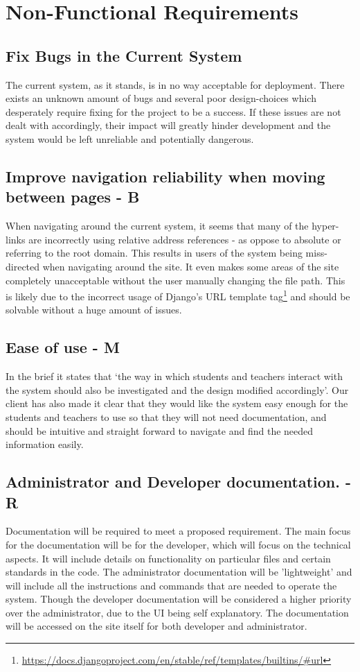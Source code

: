 \documentclass[12pt]{article}
\begin{document}
	\newpage
	
	\section{Non-Functional Requirements}
	\subsection{Fix Bugs in the Current System}
	The current system, as it stands, is in no way acceptable for deployment. There exists an unknown amount of bugs and several poor design-choices which desperately require fixing for the project to be a success. If these issues are not dealt with accordingly, their impact will greatly hinder development and the system would be left unreliable and potentially dangerous.
	\subsection{Improve navigation reliability when moving between pages - B}
	When navigating around the current system, it seems that many of the hyper-links are incorrectly using relative address references - as oppose to absolute or referring to the root domain. This results in users of the system being miss-directed when navigating around the site. It even makes some areas of the site completely unacceptable without the user manually changing the file path.  This is likely due to the incorrect usage of Django's URL template tag\footnote{\url{https://docs.djangoproject.com/en/stable/ref/templates/builtins/#url}} and should be solvable without a huge amount of issues.
	\subsection{Ease of use - M}
	In the brief it states that ‘the way in which students and teachers interact with the system should also be investigated and the design modified accordingly’. Our client has also made it clear that they would like the system easy enough for the students and teachers to use so that they will not need documentation, and should be intuitive and straight forward to navigate and find the needed information easily.
	\subsection{Administrator and Developer documentation. - R}
	Documentation will be required to meet a proposed requirement. The main focus for the documentation will be for the developer, which will focus on the technical aspects. It will include details on functionality on particular files and certain standards in the code. The administrator documentation will be 'lightweight' and will include all the instructions and commands that are needed to operate the system. Though the developer documentation will be considered a higher priority over the administrator, due to the UI being self explanatory. The documentation will be accessed on the site itself for both developer and administrator. 
\end{document}
